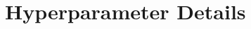 \documentclass{article}
\begin{document}




\newpage
\appendix

\section{Hyperparameter Details}
\label{app:hyperparams}
\end{document}
